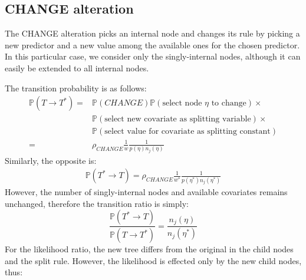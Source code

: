 \documentclass[11pt,a4paper]{article}
\newcommand{\prob}{\mathbb{P}}
\begin{document}
\subsection{CHANGE alteration}
The CHANGE alteration picks an internal node and changes its rule by picking a new predictor and a new value among the available ones for the chosen predictor. In this particular case, we consider only the singly-internal nodes, although it can easily be extended to all internal nodes.

The transition probability is as follows:
\begin{equation}
    \label{eq:CHANGE_transition}
    \begin{split}
        \prob(T \to T^*) = & \prob(CHANGE) \prob(\text{select node } \eta \text{ to change}) \times \\
                           & \prob(\text{select new covariate as splitting variable}) \times        \\
                           & \prob(\text{select value for covariate as splitting constant})         \\
        =                  & \rho_{CHANGE}\frac{1}{w}\frac{1}{p(\eta)n_j(\eta)}
    \end{split}
\end{equation}
Similarly, the opposite is:
\begin{equation}
    \label{eq:CHANGE_transition}
    \begin{split}
        \prob(T^* \to T) =
        \rho_{CHANGE}\frac{1}{w^*}\frac{1}{p(\eta^*)n_j(\eta^*)}
    \end{split}
\end{equation}
However, the number of singly-internal nodes and available covariates remains unchanged, therefore the transition ratio is simply:
\begin{equation}
    \label{change_transition_ratio}
    \frac{ \prob(T^* \to T)  }{ \prob(T \to T^*)  } = \frac{n_j(\eta)}{n_j(\eta^*)}
\end{equation}
For the likelihood ratio, the new tree differs from the original in the child nodes and the split rule. However, the likelihood is effected only by the new child nodes, thus:
\end{document}

